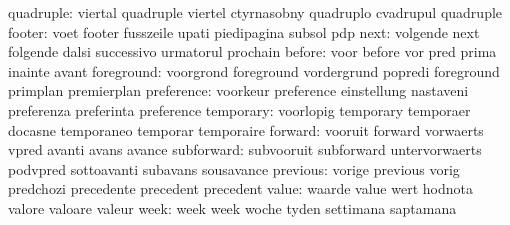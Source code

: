                 quadruple: viertal                   quadruple
                           viertel                   ctyrnasobny
                           quadruplo                 cvadrupul
                           quadruple
                   footer: voet                      footer
                           fusszeile                 upati
                           piedipagina               subsol
                           pdp
                     next: volgende                  next
                           folgende                  dalsi
                           successivo                urmatorul
                           prochain
                   before: voor                      before
                           vor                       pred
                           prima                     inainte
                           avant
               foreground: voorgrond                 foreground
                           vordergrund               popredi
                           foreground                primplan
                           premierplan
               preference: voorkeur                  preference
                           einstellung               nastaveni
                           preferenza                preferinta
                           preference
                temporary: voorlopig                 temporary
                           temporaer                 docasne
                           temporaneo                temporar
                           temporaire
                  forward: vooruit                   forward
                           vorwaerts                 vpred
                           avanti                    avans
                           avance
               subforward: subvooruit                subforward
                           untervorwaerts            podvpred
                           sottoavanti               subavans
                           sousavance
                 previous: vorige                    previous
                           vorig                     predchozi
                           precedente                precedent
                           precedent
                    value: waarde                    value
                           wert                      hodnota
                           valore                    valoare
                           valeur
                     week: week                      week
                           woche                     tyden
                           settimana                 saptamana
